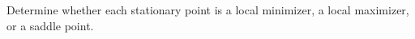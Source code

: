 Determine whether each stationary point is a local minimizer, a local maximizer, or a saddle point.

\begin{solution}
    \ \\
    \vfill
\end{solution}